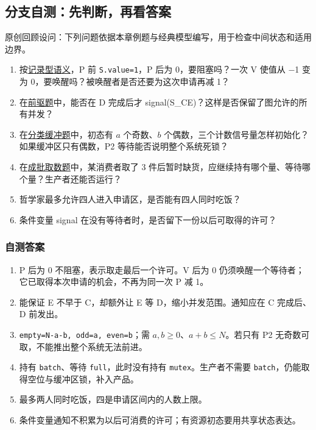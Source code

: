 \subsection{分支自测：先判断，再看答案}\label{OS02-selfcheck}

原创回顾设问：下列问题依据本章例题与经典模型编写，用于检查中间状态和适用边界。

\begin{enumerate}
\def\labelenumi{\arabic{enumi}.}
\tightlist
\item
  按\hyperref[OS02-semaphore]{记录型语义}，P 前 \texttt{S.\allowbreak{}value=\allowbreak{}1}，P 后为 0，要阻塞吗？一次 V 使值从 \ensuremath{-}1 变为 0，要唤醒吗？被唤醒者是否还要为这次申请再减 1？
\item
  在\hyperref[OS02-ex-2022]{前驱题}中，能否在 D 完成后才 signal(S\_CE)？这样是否保留了图允许的所有并发？
\item
  在\hyperref[OS02-ex-2009]{分类缓冲题}中，初态有 \(a\) 个奇数、\(b\) 个偶数，三个计数信号量怎样初始化？如果缓冲区只有偶数，P2 等待能否说明整个系统死锁？
\item
  在\hyperref[OS02-ex-2014]{成批取数题}中，某消费者取了 3 件后暂时缺货，应继续持有哪个量、等待哪个量？生产者还能否运行？
\item
  哲学家最多允许四人进入申请区，是否能有四人同时吃饭？
\item
  条件变量 signal 在没有等待者时，是否留下一份以后可取得的许可？
\end{enumerate}

\subsubsection{自测答案}\label{OS02-auto-22}

\begin{enumerate}
\def\labelenumi{\arabic{enumi}.}
\tightlist
\item
  P 后为 0 不阻塞，表示取走最后一个许可。V 后为 0 仍须唤醒一个等待者；它已取得本次申请的机会，不再为同一次 P 减 1。
\item
  能保证 E 不早于 C，却额外让 E 等 D，缩小并发范围。通知应在 C 完成后、D 前发出。
\item
  \texttt{empty=\allowbreak{}N-a-b,\allowbreak{} odd=\allowbreak{}a,\allowbreak{} even=\allowbreak{}b}；需 \(a,b\ge0\)、\(a+b\le N\)。若只有 P2 无奇数可取，不能推出整个系统无法前进。
\item
  持有 \texttt{batch}、等待 \texttt{full}，此时没有持有 \texttt{mutex}。生产者不需要 \texttt{batch}，仍能取得空位与缓冲区锁，补入产品。
\item
  最多两人同时吃饭，四是申请区间内的人数上限。
\item
  条件变量通知不积累为以后可消费的许可；有资源初态要用共享状态表达。
\end{enumerate}

